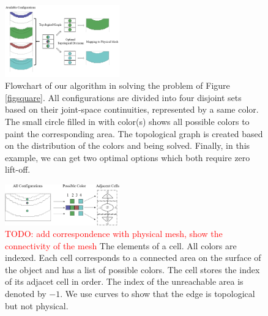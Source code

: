\documentclass[journal]{IEEEtran}
\begin{document}
\begin{figure}[t]
\centering
\includegraphics[width = 0.44\textwidth]{flowchart}
\caption{
Flowchart of our algorithm in solving the problem of Figure \ref{figsquare}. 
All configurations are divided into four disjoint sets based on their joint-space continuities, represented by a same color. 
The small circle filled in with color(s) shows all possible colors to paint the corresponding area. The topological graph is created based on the distribution of the colors and being solved. Finally, in this example, we can get two optimal options which both require zero lift-off. 
}\label{flowchart}
\end{figure}


\begin{figure}[t]
\centering
\includegraphics[width = 0.44\textwidth]{square_example/graphcreation}
\caption{
\textcolor{red}{TODO: add correspondence with physical mesh, show the connectivity of the mesh}
The elements of a cell. All colors are indexed. Each cell corresponds to a connected area on the surface of the object and has a list of possible colors. The cell stores the index of its adjacet cell in order. The index of the unreachable area is denoted by $-1$. We use curves to show that the edge is topological but not physical. }\label{figforcolor}
\end{figure}
\end{document}
